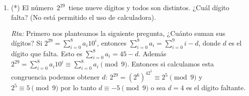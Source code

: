 \documentclass[a4paper,12pt,twoside,spanish,reqno]{amsbook}
\numberwithin{equation}{section}
\newcommand{\rta}{\noindent\textit{Rta: }}
\begin{document}
\begin{enumerate}
    \item (*) El número \,$2^{29}$\, tiene nueve dígitos y todos son distintos.
    ¿Cuál dígito falta? (No está permitido el uso de calculadora).
    
    \rta Primero nos planteamos la siguiente pregunta, ¿Cuánto suman sus dígitos? Si $2^{29} =  \sum_{i=0}^8 a_i10^i$, entonces  $\sum_{i=0}^8 a_i= \sum_{i=0}^9i-d$, donde $d$ es el dígito que falta.
    Esto es $\sum_{i=0}^8 a_i= 45-d$. Además $2^{29} = \sum_{i=0}^8 a_i10^i \equiv \sum_{i=0}^8 a_i\pmod{9} $.     Entonces si calculamos esta congruencia podemos obtener $d$: 
    $2^{29}=(2^6)^42^5\equiv 2^5 \pmod{9}$ y $2^5\equiv 5 \pmod{9}$ por lo tanto $d\equiv -5 \pmod{9}$ o sea $d=4$ es el dígito faltante. 
    
\end{enumerate}
\end{document}
